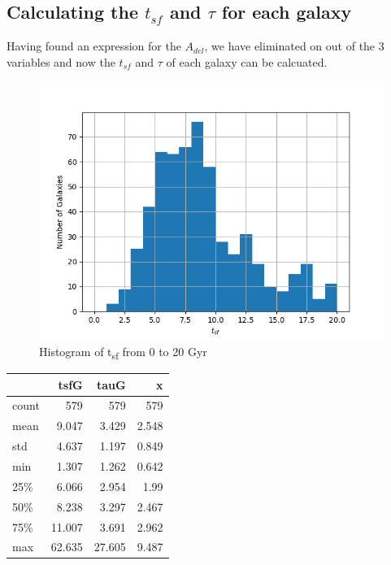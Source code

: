 \documentclass[a4paper,twocolumn]{article}
\begin{document}
\subsection{Calculating the \(t_{sf}\) and \(\tau\) for each galaxy}
\label{sec:org38a8c66}

Having found an expression for the \(A_{del}\), we have eliminated on out of the 3 variables and now the \(t_{sf}\) and \(\tau\) of each galaxy can be calcuated.

\begin{figure}[!htpb]
\centering
\includegraphics[width=.9\linewidth]{./figs/tsf-hist.png}
\caption{\label{fig:Histogram of t_{sf} from 0 to 20 Gyr}Histogram of t\textsubscript{sf} from 0 to 20 Gyr}
\end{figure}

\begin{center}
\begin{tabular}{lrrr}
 & tsfG & tauG & x\\[0pt]
\hline
count & 579 & 579 & 579\\[0pt]
mean & 9.047 & 3.429 & 2.548\\[0pt]
std & 4.637 & 1.197 & 0.849\\[0pt]
min & 1.307 & 1.262 & 0.642\\[0pt]
25\% & 6.066 & 2.954 & 1.99\\[0pt]
50\% & 8.238 & 3.297 & 2.467\\[0pt]
75\% & 11.007 & 3.691 & 2.962\\[0pt]
max & 62.635 & 27.605 & 9.487\\[0pt]
\end{tabular}
\end{center}
\end{document}
